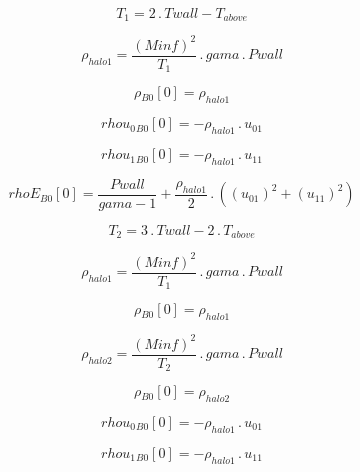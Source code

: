 \documentclass{article}
\begin{document}
\begin{dmath}T_{1} = 2 \,.\, Twall - T_{above}\end{dmath}

\begin{dmath}\rho_{halo 1} = \frac{\left(Minf \right)^{2}}{T_{1}} \,.\, gama \,.\, Pwall\end{dmath}

\begin{dmath}{\rho{_{B0}}}[{0}] = \rho_{halo 1}\end{dmath}

\begin{dmath}{rhou_{0}{_{B0}}}[{0}] = - \rho_{halo 1} \,.\, u_{01}\end{dmath}

\begin{dmath}{rhou_{1}{_{B0}}}[{0}] = - \rho_{halo 1} \,.\, u_{11}\end{dmath}

\begin{dmath}{rhoE{_{B0}}}[{0}] = \frac{Pwall}{gama - 1} + \frac{\rho_{halo 1}}{2} \,.\, \left(\left(u_{01} \right)^{2} + \left(u_{11} \right)^{2}\right)\end{dmath}

\begin{dmath}T_{2} = 3 \,.\, Twall - 2 \,.\, T_{above}\end{dmath}

\begin{dmath}\rho_{halo 1} = \frac{\left(Minf \right)^{2}}{T_{1}} \,.\, gama \,.\, Pwall\end{dmath}

\begin{dmath}{\rho{_{B0}}}[{0}] = \rho_{halo 1}\end{dmath}

\begin{dmath}\rho_{halo 2} = \frac{\left(Minf \right)^{2}}{T_{2}} \,.\, gama \,.\, Pwall\end{dmath}

\begin{dmath}{\rho{_{B0}}}[{0}] = \rho_{halo 2}\end{dmath}

\begin{dmath}{rhou_{0}{_{B0}}}[{0}] = - \rho_{halo 1} \,.\, u_{01}\end{dmath}

\begin{dmath}{rhou_{1}{_{B0}}}[{0}] = - \rho_{halo 1} \,.\, u_{11}\end{dmath}
\end{document}
